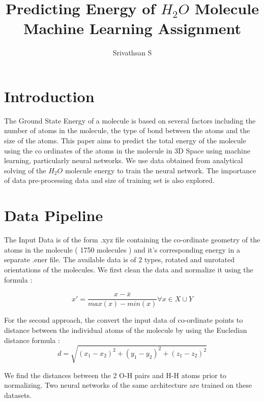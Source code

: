 \documentclass{article}
\begin{document}
\title{Predicting Energy of $H_2O$ Molecule\\ \large Machine Learning Assignment}

\author{Srivathsan S}
\maketitle

\section{Introduction}
\begin{flushleft}
    The Ground State Energy of a molecule is based on several factors including the number of atoms in the molecule, the type of bond between the atoms
    and the size of the atoms. This paper aims to predict the total energy of the molecule using the co ordinates of the atoms in the molecule in 3D Space
    using machine learning, particularly neural networks. We use data obtained from analytical solving of the $H_2O$ molecule energy to train the neural
    network. The importance of data pre-processing data and size of training set is also explored.
\end{flushleft}


\section{Data Pipeline}
\begin{flushleft}
    The Input Data is of the form .xyz file containing the co-ordinate geometry of the atoms in the molecule ( 1750 molecules ) and it's corresponding energy
    in a separate .ener file. The available data is of 2 types, rotated and unrotated orientations of the molecules. We first clean the data and normalize it
    using the formula :

    $$ x' = \frac{x - \bar{x}}{max(x) - min(x)} \forall x \in X \cup Y $$

    For the second approach, the convert the input data of co-ordinate points to distance between the individual atoms of the molecule by using the
    Eucledian distance formula :
    $$ d = \sqrt{(x_1 - x_2)^2 + (y_1 - y_2)^2 + (z_1 - z_2)^2} $$

    We find the distances between the 2 O-H pairs and H-H atoms prior to normalizing. Two neural networks of the same architecture are trained on these
    datasets.
\end{flushleft}
\end{document}
